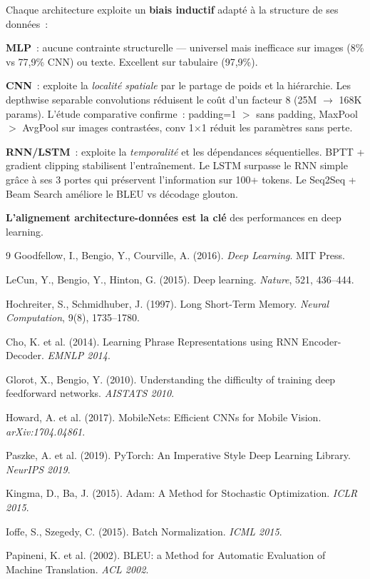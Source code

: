 \documentclass[12pt,a4paper]{report}
\begin{document}
\begin{infobox}
Chaque architecture exploite un \textbf{biais inductif} adapté à la structure de ses données~:

\medskip\textbf{MLP}~: aucune contrainte structurelle --- universel mais inefficace sur images 
(8\% vs 77,9\% CNN) ou texte. Excellent sur tabulaire (97,9\%).

\medskip\textbf{CNN}~: exploite la \textit{localité spatiale} par le partage de poids et la 
hiérarchie. Les depthwise separable convolutions réduisent le coût d'un facteur 8 (25M $\to$ 168K 
params). L'étude comparative confirme~: padding=1 $>$ sans padding, MaxPool $>$ AvgPool sur 
images contrastées, conv 1$\times$1 réduit les paramètres sans perte.

\medskip\textbf{RNN/LSTM}~: exploite la \textit{temporalité} et les dépendances séquentielles. 
BPTT + gradient clipping stabilisent l'entraînement. Le LSTM surpasse le RNN simple grâce à 
ses 3 portes qui préservent l'information sur 100+ tokens. Le Seq2Seq + Beam Search améliore 
le BLEU vs décodage glouton.

\medskip \textbf{L'alignement architecture-données est la clé} des performances en deep learning.
\end{infobox}

\begin{thebibliography}{9}
Goodfellow, I., Bengio, Y., Courville, A. (2016).
\textit{Deep Learning}. MIT Press.

LeCun, Y., Bengio, Y., Hinton, G. (2015).
Deep learning. \textit{Nature}, 521, 436--444.

Hochreiter, S., Schmidhuber, J. (1997).
Long Short-Term Memory. \textit{Neural Computation}, 9(8), 1735--1780.

Cho, K. et al. (2014).
Learning Phrase Representations using RNN Encoder-Decoder.
\textit{EMNLP 2014}.

Glorot, X., Bengio, Y. (2010).
Understanding the difficulty of training deep feedforward networks.
\textit{AISTATS 2010}.

Howard, A. et al. (2017).
MobileNets: Efficient CNNs for Mobile Vision.
\textit{arXiv:1704.04861}.

Paszke, A. et al. (2019).
PyTorch: An Imperative Style Deep Learning Library.
\textit{NeurIPS 2019}.

Kingma, D., Ba, J. (2015).
Adam: A Method for Stochastic Optimization.
\textit{ICLR 2015}.

Ioffe, S., Szegedy, C. (2015).
Batch Normalization. \textit{ICML 2015}.

Papineni, K. et al. (2002).
BLEU: a Method for Automatic Evaluation of Machine Translation.
\textit{ACL 2002}.
\end{thebibliography}
\end{document}
